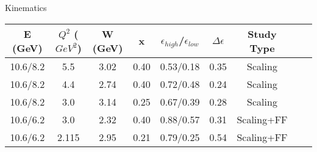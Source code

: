 \begin{Mtable}{Kinematics}
  \centering
  \begin{tabular}{|c|c|c|c|c|c|c|c|c|}
    \hline
    \textbf{E (GeV)} & \textbf{$Q^2$ ($GeV^2$)} & \textbf{W (GeV)} & \textbf{x} & \textbf{$\epsilon_{high}$/$\epsilon_{low}$} & \textbf{$\Delta\epsilon$} & \textbf{Study Type}\\
    \hline
    10.6/8.2 & 5.5 & 3.02 & 0.40 & 0.53/0.18 & 0.35 & Scaling \\
    10.6/8.2 & 4.4 & 2.74 & 0.40 & 0.72/0.48 & 0.24 & Scaling \\
    10.6/8.2 & 3.0 & 3.14 & 0.25 & 0.67/0.39 & 0.28 & Scaling \\
    10.6/6.2 & 3.0 & 2.32 & 0.40 & 0.88/0.57 & 0.31 & Scaling+FF \\
    10.6/6.2 & 2.115 & 2.95 & 0.21 & 0.79/0.25 & 0.54 & Scaling+FF \\
    \hline
    \end{tabular}
  \caption{Summary of all kinematics for the KaonLT 2018-19 experiment.}
  \label{tab:1-1_kinematics}
\end{Mtable}

